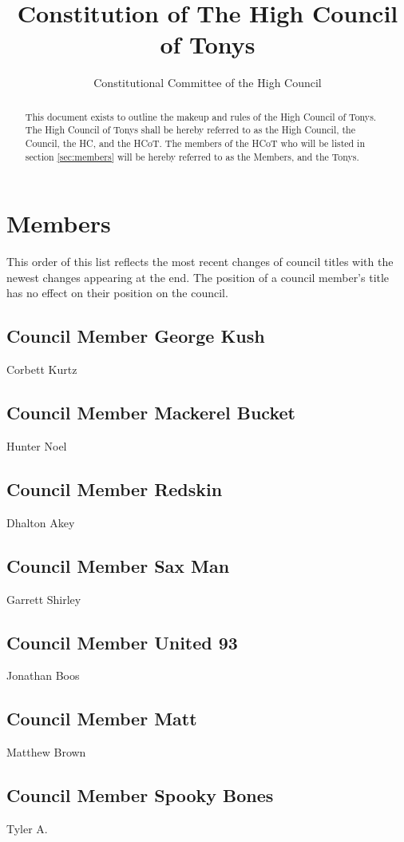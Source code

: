 \documentclass[]{article}
\title{Constitution of The High Council of Tonys}
\author{Constitutional Committee of the High Council}
\begin{document}
	
\maketitle

\tableofcontents
\newpage

\begin{abstract}
	This document exists to outline the makeup and rules of the High Council of Tonys. The High Council of Tonys shall be hereby referred to as the High Council, the Council, the HC, and the HCoT. The members of the HCoT who will be listed in section \ref{sec:members} will be hereby referred to as the Members, and the Tonys.
\end{abstract}


\section{Members}
\label{sec:members}
	This order of this list reflects the most recent changes of council titles with the newest changes appearing at the end. The position of a council member's title has no effect on their position on the council.
	\subsection{Council Member George Kush}
	\label{subsec:corbett}
		Corbett Kurtz
	\subsection{Council Member Mackerel Bucket}
	\label{subsec:hunter}
		Hunter Noel
	\subsection{Council Member Redskin}
	\label{subsec:dhalton}
		Dhalton Akey
	\subsection{Council Member Sax Man}
	\label{subsec:garrett}
		Garrett Shirley
	\subsection{Council Member United 93}
	\label{subsec:jon}
		Jonathan Boos
	\subsection{Council Member Matt}
	\label{subsec:matt}
		Matthew Brown
	\subsection{Council Member Spooky Bones}
	\label{subsec:tyler}
		Tyler A.
\end{document}
